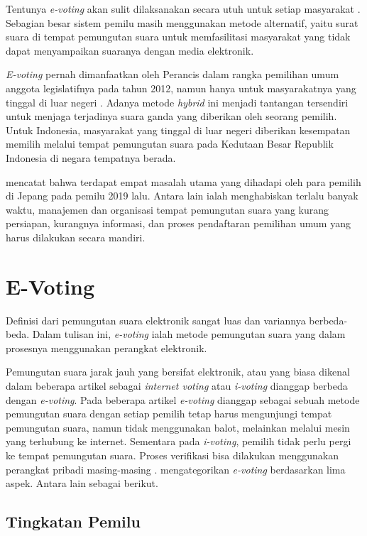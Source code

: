 Tentunya \textit{e-voting} akan sulit dilaksanakan secara utuh untuk setiap masyarakat \citep{7001136}. Sebagian besar sistem pemilu masih menggunakan metode alternatif, yaitu surat suara di tempat pemungutan suara untuk memfasilitasi masyarakat yang tidak dapat menyampaikan suaranya dengan media elektronik.

\textit{E-voting} pernah dimanfaatkan oleh Perancis dalam rangka pemilihan umum anggota legislatifnya pada tahun 2012, namun hanya untuk masyarakatnya yang tinggal di luar negeri \citep{france}. Adanya metode \textit{hybrid} ini menjadi tantangan tersendiri untuk menjaga terjadinya suara ganda yang diberikan oleh seorang pemilih. Untuk Indonesia, masyarakat yang tinggal di luar negeri diberikan kesempatan memilih melalui tempat pemungutan suara pada Kedutaan Besar Republik Indonesia di negara tempatnya berada.

\cite{Pujiatin_2021} mencatat bahwa terdapat empat masalah utama yang dihadapi oleh para pemilih di Jepang pada pemilu 2019 lalu. Antara lain ialah menghabiskan terlalu banyak waktu, manajemen dan organisasi tempat pemungutan suara yang kurang persiapan, kurangnya informasi, dan proses pendaftaran pemilihan umum yang harus dilakukan secara mandiri.

\section{E-Voting}

Definisi dari pemungutan suara elektronik sangat luas dan variannya berbeda-beda. Dalam tulisan ini, \textit{e-voting} ialah metode pemungutan suara yang dalam prosesnya menggunakan perangkat elektronik.

Pemungutan suara jarak jauh yang bersifat elektronik, atau yang biasa dikenal dalam beberapa artikel sebagai \textit{internet voting} atau \textit{i-voting} dianggap berbeda dengan \textit{e-voting}. Pada beberapa artikel \textit{e-voting} dianggap sebagai sebuah metode pemungutan suara dengan setiap pemilih tetap harus mengunjungi tempat pemungutan suara, namun tidak menggunakan balot, melainkan melalui mesin yang terhubung ke internet. Sementara pada \textit{i-voting}, pemilih tidak perlu pergi ke tempat pemungutan suara. Proses verifikasi bisa dilakukan menggunakan perangkat pribadi masing-masing \cite{8651451}. \cite{review1} mengategorikan \textit{e-voting} berdasarkan lima aspek. Antara lain sebagai berikut.

\subsection{Tingkatan Pemilu}

